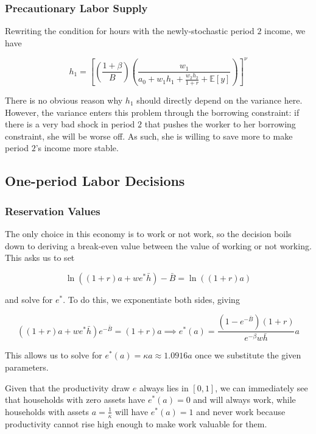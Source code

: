 \documentclass[12pt, letterpaper, parskip = full]{article}
\newcommand{\Ex}[1]{\mathbb{E}\left[#1\right]}
\begin{document}
    \subsubsection{Precautionary Labor Supply}

    Rewriting the condition for hours with the newly-stochastic period \(2\) income, we have

    \[  h_1 = \left[ \left(\frac{1+\beta}{B}\right) \left(\frac{w_1}{ a_0 + w_1 h_1 + \frac{w_2 h_2}{1+r} + \Ex{y}}\right)  \right]^\nu   \]

    There is no obvious reason why \(h_1\) should directly depend on the variance here. However, the variance enters this problem through the borrowing constraint: if there is a very bad shock in period \(2\) that pushes the worker to her borrowing constraint, she will be worse off. As such, she is willing to save more to make period \(2\)'s income more stable. 

    \subsection{One-period Labor Decisions}

    \subsubsection{Reservation Values}

    The only choice in this economy is to work or not work, so the decision boils down to deriving a break-even value between the value of working or not working. This asks us to set

    \[  \ln((1+r) a + we^* \bar{h}) - \bar{B} = \ln((1+r) a)   \]

    and solve for \(e^*\). To do this, we exponentiate both sides, giving

    \[ \left((1+r) a + we^* \bar{h}\right) e^{-\bar{B}} = (1+r) a \implies e^*(a) = \frac{(1 - e^{-\bar{B}}) (1+r)}{e^{-\beta} w \bar{h}} a  \]

    This allows us to solve for \(e^*(a) = \kappa a \approx 1.0916 a\) once we substitute the given parameters. 
    
    Given that the productivity draw \(e\) always lies in \([0,1]\), we can immediately see that households with zero assets have \(e^*(a) = 0\) and will always work, while households with assets \(a = \frac{1}{\kappa}\) will have \(e^*(a) = 1\) and never work because productivity cannot rise high enough to make work valuable for them. 
\end{document}
